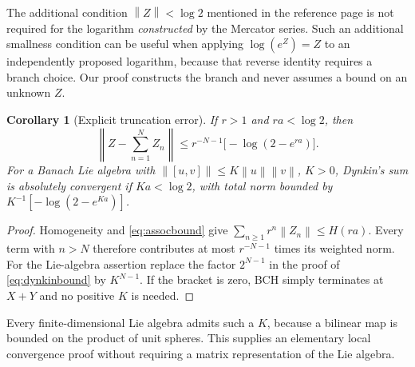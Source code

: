 \documentclass[11pt]{article}
\numberwithin{equation}{section}
\newtheorem{corollary}[corollary]{Corollary}
\theoremstyle{definition}
\theoremstyle{remark}
\newcommand{\norm}[1]{\left\lVert#1\right\rVert}
\begin{document}
The additional condition $\norm{Z}<\log2$ mentioned in the reference
page is not required for the logarithm \emph{constructed} by the
Mercator series. Such an additional smallness condition can be useful
when applying $\log(e^Z)=Z$ to an independently proposed logarithm,
because that reverse identity requires a branch choice. Our proof
constructs the branch and never assumes a bound on an unknown $Z$.

\begin{corollary}[Explicit truncation error]\label{cor:remainder}
If $r>1$ and $ra<\log2$, then
\begin{equation}\label{eq:remainder}
 \left\|Z-\sum_{n=1}^N Z_n\right\|
 \leq r^{-N-1}\bigl[-\log(2-e^{ra})\bigr].
\end{equation}
For a Banach Lie algebra with
$\norm{[u,v]}\leq K\norm{u}\norm{v}$, $K>0$, Dynkin's sum is
absolutely convergent if $Ka<\log2$, with total norm bounded by
$K^{-1}[-\log(2-e^{Ka})]$.
\end{corollary}
\begin{proof}
Homogeneity and \eqref{eq:assocbound} give
$\sum_{n\geq1}r^n\norm{Z_n}\leq H(ra)$. Every term with $n>N$
therefore contributes at most $r^{-N-1}$ times its weighted norm.
For the Lie-algebra assertion replace the factor $2^{N-1}$ in the
proof of \eqref{eq:dynkinbound} by $K^{N-1}$. If the bracket is zero,
BCH simply terminates at $X+Y$ and no positive $K$ is needed.
\end{proof}
Every finite-dimensional Lie algebra admits such a $K$, because a
bilinear map is bounded on the product of unit spheres. This supplies
an elementary local convergence proof without requiring a matrix
representation of the Lie algebra.
\end{document}
